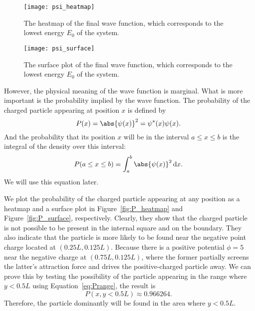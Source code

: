 \begin{figure}[!hbt]
    \centering
    \texttt{[image: psi\_heatmap]}
    \caption{The heatmap of the final wave function, which corresponds to the
        lowest energy \(E_0\) of the system.}
    \label{fig:psi_heatmap}
\end{figure}

\begin{figure}[!hbt]
    \centering
    \texttt{[image: psi\_surface]}
    \caption{The surface plot of the final wave function, which corresponds to the
        lowest energy \(E_0\) of the system.}
    \label{fig:psi_surface}
\end{figure}

However, the physical meaning of the wave function is marginal.
What is more important is the probability implied by the wave function.
The probability of the charged particle appearing at position \(x\) is defined by
%
\begin{equation}
    P(x) = \abs{\psi(x)}^2 = \psi^\ast(x) \psi(x).
\end{equation}
%
And the probability that its position \(x\) will be in the interval \(a \leq x \leq b\) is the
integral of the density over this interval:
%
\begin{equation}\label{eq:Prange}
    P(a \leq x \leq b) = \int_{a}^{b} \abs{\psi(x)}^2 \, \mathrm{d}x.
\end{equation}
%
We will use this equation later.

We plot the probability of the charged particle appearing at any position
as a heatmap and a surface plot in Figure~\ref{fig:P_heatmap} and Figure~\ref{fig:P_surface},
respectively.
Clearly, they show that the charged particle is not possible to be present in the
internal square and on the boundary.
They also indicate that the particle is more likely to be found near the negative
point charge located at \((0.25L, 0.125L)\). Because there is a positive potential
\(\phi = 5\) near the negative charge at \((0.75L, 0.125L)\), where the former partially
screens the latter's attraction force and drives the positive-charged particle away.
We can prove this by testing the possibility of the particle appearing in the
range where \(y < 0.5L\) using Equation~\eqref{eq:Prange}, the result is
%
\begin{equation}
    P(x, y < 0.5L) \approx 0.966264.
\end{equation}
%
Therefore, the particle dominantly will be found in the area where \(y < 0.5L\).

